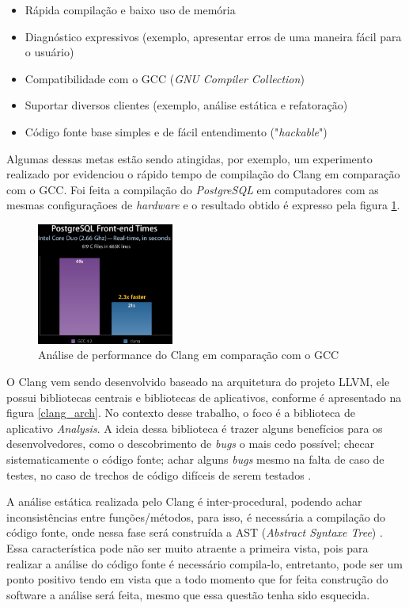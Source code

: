 \begin{itemize}
  \item Rápida compilação e baixo uso de memória
  \item Diagnóstico expressivos (exemplo, apresentar erros de uma maneira fácil para o usuário)
  \item Compatibilidade com o GCC (\textit{GNU Compiler Collection})
  \item Suportar diversos clientes (exemplo, análise estática e refatoração)
  \item Código fonte base simples e de fácil entendimento ("\textit{hackable}")
\end{itemize}

Algumas dessas metas estão sendo atingidas, por exemplo, um experimento realizado por \cite{naroff2009} evidenciou o rápido
tempo de compilação do Clang em comparação com o GCC. Foi feita a compilação do \textit{PostgreSQL} em computadores com as
mesmas configuraçãoes de \textit{hardware} e o resultado obtido é expresso pela figura \ref{clang_gcc}.

\begin{figure}[h]
  \centering
  \includegraphics[width=0.4\textwidth]
      {figuras/clang_gcc.eps}
  \caption{Análise de performance do Clang em comparação com o GCC}
  \label{clang_gcc}
\end{figure}

O Clang vem sendo desenvolvido baseado na arquitetura do projeto LLVM, ele possui bibliotecas centrais e bibliotecas de 
aplicativos, conforme é apresentado na figura \ref{clang_arch}. No contexto desse trabalho, o foco é a biblioteca de aplicativo
\textit{Analysis}. A ideia dessa biblioteca é trazer alguns benefícios para os desenvolvedores, como o descobrimento de 
\textit{bugs} o mais cedo possível; checar sistematicamente o código fonte; achar alguns \textit{bugs} mesmo na falta de caso
de testes, no caso de trechos de código difíceis de serem testados \cite{kremenek2009}. 

A análise estática realizada pelo Clang é inter-procedural, podendo achar inconsistências entre funções/métodos, para isso,
é necessária a compilação do código fonte, onde nessa fase será construída a AST (\textit{Abstract Syntaxe Tree})
\cite{kremenek2009}. Essa característica pode não ser muito atraente a primeira vista, pois para realizar a análise do código 
fonte é necessário compila-lo, entretanto, pode ser um ponto positivo tendo em vista que a todo momento que for feita 
construção do software a análise será feita, mesmo que essa questão tenha sido esquecida.

